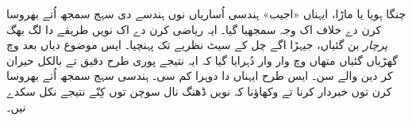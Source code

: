 \documentclass[../../../include/open-logic-section]{subfiles}
\begin{document}
چنگا ہویا یا ماڑا، ایہناں «اجیب» ہندسی اُساریاں نوں ہندسے دی سہج سمجھ اُتے بھروسا کرن دے خلاف اک وجہ سمجھیا گیا۔ ایہ ریاضی کرن دے اک نویں طریقے دا لگ بھگ \emph{پرچار} بن گئیاں، جیہڑا اگے چل کے سیٹ نظریے تک پہنچیا۔ ایس موضوع دیاں بعد وچ گھڑیاں گئیاں متھاں وچ وار وار دُہرایا گیا کہ ایہ نتیجے پوری طرح دقیق تے بالکل حیران کر دین والے سن۔ ایس طرح ایہناں دا دوہرا کم سی۔ ہندسی سہج سمجھ اُتے بھروسا کرن توں خبردار کرنا تے وکھاؤنا کہ نویں ڈھنگ نال سوچن توں کِنّے نتیجے نکل سکدے نیں۔
\end{document}
